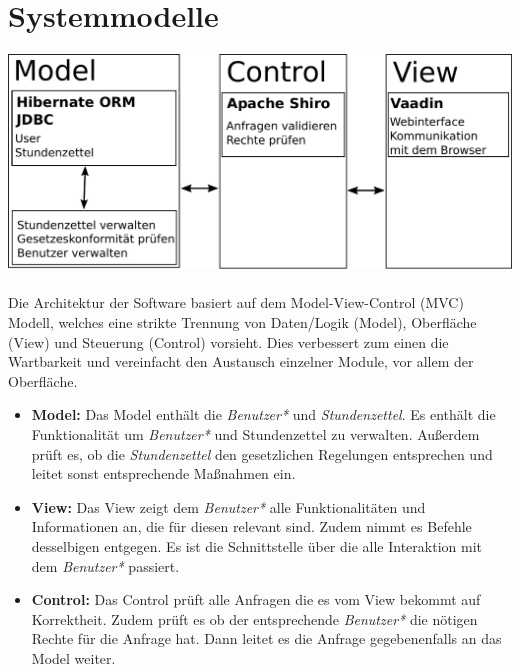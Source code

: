 \section{Systemmodelle}

\includegraphics[width=\linewidth]{mvc.pdf}\\
\\
Die Architektur der Software basiert auf dem Model-View-Control (MVC) Modell, welches eine strikte Trennung von Daten/Logik (Model), Oberfläche (View) und Steuerung (Control) vorsieht.
Dies verbessert zum einen die Wartbarkeit und vereinfacht den Austausch einzelner Module, vor allem der Oberfläche.
\begin{itemize}
	\item \textbf{Model:}
		Das Model enthält die \emph{Benutzer*} und \emph{Stundenzettel}.
		Es enthält die Funktionalität um \emph{Benutzer*} und Stundenzettel zu verwalten.
		Außerdem prüft es, ob die \emph{Stundenzettel} den gesetzlichen Regelungen entsprechen und leitet sonst entsprechende Maßnahmen ein.
	\item \textbf{View:}
		Das View zeigt dem \emph{Benutzer*} alle Funktionalitäten und Informationen an, die für diesen relevant sind.
		Zudem nimmt es Befehle desselbigen entgegen.
		Es ist die Schnittstelle über die alle Interaktion mit dem \emph{Benutzer*} passiert.
	\item \textbf{Control:}
		Das Control prüft alle Anfragen die es vom View bekommt auf Korrektheit.
		Zudem prüft es ob der entsprechende \emph{Benutzer*} die nötigen Rechte für die Anfrage hat.
		Dann leitet es die Anfrage gegebenenfalls an das Model weiter.
\end{itemize}
